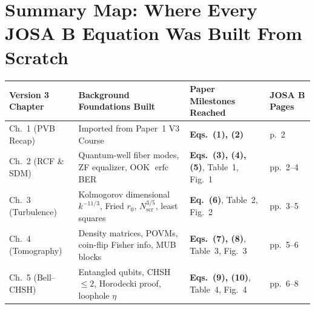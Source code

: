 \documentclass[10pt,letterpaper]{article}
\numberwithin{equation}{section}
\begin{document}
\section*{Summary Map: Where Every JOSA B Equation Was Built From Scratch}

\begin{table}[ht!]
\centering
\scriptsize
\renewcommand{\arraystretch}{1.12}
\setlength{\tabcolsep}{5pt}
\begin{tabular}{@{}llll@{}}
\toprule
\textbf{Version 3 Chapter} & \textbf{Background Foundations Built} & \textbf{Paper Milestones Reached} & \textbf{JOSA B Pages} \\
\midrule
Ch.~1 (PVB Recap) & Imported from Paper~1 V3 Course & \textbf{Eqs.~(1), (2)} & p.~2 \\
Ch.~2 (RCF \& SDM) & Quantum-well fiber modes, ZF equalizer, OOK $\operatorname{erfc}$ BER & \textbf{Eqs.~(3), (4), (5)}, Table~1, Fig.~1 & pp.~2--4 \\
Ch.~3 (Turbulence) & Kolmogorov dimensional $k^{-11/3}$, Fried $r_0$, $N_{\mathrm{scr}}^{3/5}$, least squares & \textbf{Eq.~(6)}, Table~2, Fig.~2 & pp.~3--5 \\
Ch.~4 (Tomography) & Density matrices, POVMs, coin-flip Fisher info, MUB blocks & \textbf{Eqs.~(7), (8)}, Table~3, Fig.~3 & pp.~5--6 \\
Ch.~5 (Bell--CHSH) & Entangled qubits, CHSH $\le 2$, Horodecki proof, loophole $\eta$ & \textbf{Eqs.~(9), (10)}, Table~4, Fig.~4 & pp.~6--8 \\
\bottomrule
\end{tabular}
\end{table}
\end{document}
